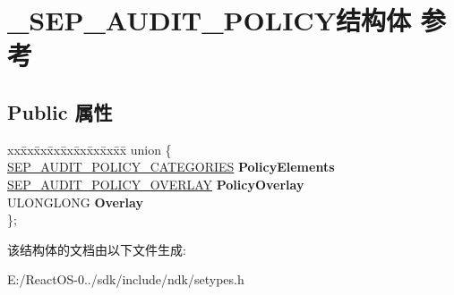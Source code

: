 \hypertarget{struct___s_e_p___a_u_d_i_t___p_o_l_i_c_y}{}\section{\+\_\+\+S\+E\+P\+\_\+\+A\+U\+D\+I\+T\+\_\+\+P\+O\+L\+I\+C\+Y结构体 参考}
\label{struct___s_e_p___a_u_d_i_t___p_o_l_i_c_y}
\subsection*{Public 属性}
\begin{DoxyCompactItemize}
\item 
\mbox{\label{struct___s_e_p___a_u_d_i_t___p_o_l_i_c_y_afc293b6bf1de899f02364d596d9eb047}} 
\begin{tabbing}
xx\=xx\=xx\=xx\=xx\=xx\=xx\=xx\=xx\=\kill
union \{\\
\>\hyperlink{struct___s_e_p___a_u_d_i_t___p_o_l_i_c_y___c_a_t_e_g_o_r_i_e_s}{SEP\_AUDIT\_POLICY\_CATEGORIES} {\bfseries PolicyElements}\\
\>\hyperlink{struct___s_e_p___a_u_d_i_t___p_o_l_i_c_y___o_v_e_r_l_a_y}{SEP\_AUDIT\_POLICY\_OVERLAY} {\bfseries PolicyOverlay}\\
\>ULONGLONG {\bfseries Overlay}\\
\}; \\

\end{tabbing}\end{DoxyCompactItemize}


该结构体的文档由以下文件生成\+:\begin{DoxyCompactItemize}
\item 
E\+:/\+React\+O\+S-\/0../sdk/include/ndk/setypes.\+h\end{DoxyCompactItemize}
